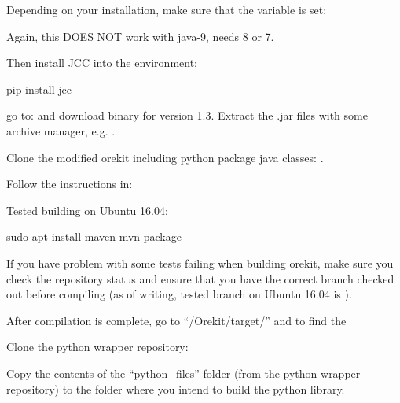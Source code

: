 \documentclass[letterpaper,10pt,english]{sphinxmanual}
\begin{document}
Depending on your installation, make sure that the  variable is set:

%
\begin{sphinxVerbatim}[commandchars=\\\{\}]
 
\end{sphinxVerbatim}

Again, this DOES NOT work with java-9, needs 8 or 7.

Then install JCC into the environment:

%
\begin{sphinxVerbatim}[commandchars=\\\{\}]
pip install jcc
\end{sphinxVerbatim}

go to:  and download binary for version 1.3.
Extract the .jar files with some archive manager, e.g. .

Clone the modified orekit including python package java classes:  .

Follow the instructions in:

Tested building on Ubuntu 16.04:

%
\begin{sphinxVerbatim}[commandchars=\\\{\}]
 sudo apt install maven
mvn package
\end{sphinxVerbatim}

If you have problem with some tests failing when building orekit, make sure you check the 
repository status and ensure that you have the correct branch checked out before compiling (as of writing, tested branch on Ubuntu 16.04 is ).

After compilation is complete, go to “/Orekit/target/” and to find the 

Clone the python wrapper repository: 

Copy the contents of the “python\_files” folder (from the python wrapper repository) to the folder where you intend to build the python library.
\end{document}
